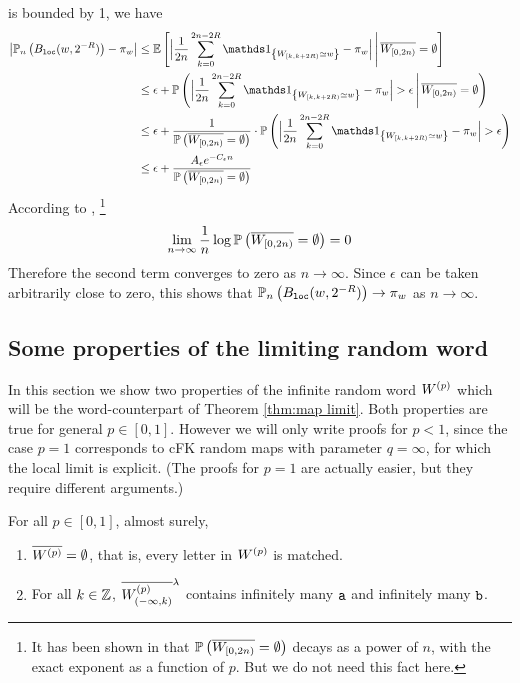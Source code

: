 \documentclass[a4paper]{article}
\begin{document}
is bounded by 1, we have
\begin{align*}
	 	\abs{ \proba_n\Par{ B\sub{loc}(w,2^{-R}) } -\pi_w }
&\leq	\expect\Econd{ 
		\Big| \frac{1}{2n} \sum_{k=0}^{2n-2R} \idd{W_{[k,k+2R)} \simeq w} - \pi_w \Big|
		}{ \rd{W_{[0,2n)}}=\emptystr }
\\&\leq \epsilon + \proba\Pcond{ 
		\Big| \frac{1}{2n} \sum_{k=0}^{2n-2R} \idd{W_{[k,k+2R)} \simeq w} - \pi_w \Big|
		> \epsilon
		}{ \rd{W_{[0,2n)}}=\emptystr }
\\&\leq	\epsilon + \frac{1}{ \proba\Par{ \rd{W_{[0,2n)}}=\emptystr }} \cdot
		\proba\Par{
		\Big| \frac{1}{2n} \sum_{k=0}^{2n-2R} \idd{W_{[k,k+2R)} \simeq w} - \pi_w \Big|
		> \epsilon  }
\\&\leq \epsilon + \frac{A_\epsilon e^{-C_\epsilon n}}{ \proba\Par{ \rd{W_{[0,2n)}}=\emptystr }}
\end{align*}
According to \cite[Eq.\ (28)]{She11}, \footnote{It has been shown in \cite{GMS15} that $\mathbb{P}\left( \overline{W_{[0,2n)}}=\emptyset \right)$ decays as a power of $n$, with the exact exponent as a function of $p$. But we do not need this fact here.}
$$
	\lim_{n\to\infty} \frac{1}{n} \log \mathbb{P}\left( \overline{W_{[0,2n)}}=\emptyset \right) = 0
$$
Therefore the second term converges to zero as $n\to\infty$.
Since $\epsilon$ can be taken arbitrarily close to zero, this shows that $\mathbb{P}_n\left( B_{\mathtt{loc}}(w,2^{-R}) \right) \to \pi_w$ as $n\to\infty$.

\subsection{Some properties of the limiting random word}
\label{sub:limit properties}


In this section we show two properties of the infinite random word $W^{(p)}$ which will be the word-counterpart of Theorem \ref{thm:map limit}.
Both properties are true for general $p\in[0,1]$.
However we will only write proofs for $p<1$, since the case $p=1$ corresponds to cFK random maps with parameter $q=\infty$, for which the local limit is explicit.
(The proofs for $p=1$ are actually easier, but they require different arguments.)

\begin{prop}\label{prop:pre-continuity}
For all $p\in[0,1]$, almost surely,
\begin{enumerate}
\item	$\overline{W^{(p)}}=\emptyset$, that is, every letter in $W^{(p)}$ is matched.
\item	For all $k\in\mathbb{Z}$, $\overline{W^{(p)}_{(-\infty,k)}}^\lambda$ contains infinitely many $\mathtt{a}$ and infinitely many $\mathtt{b}$.
\end{enumerate}
\end{prop}
\end{document}
